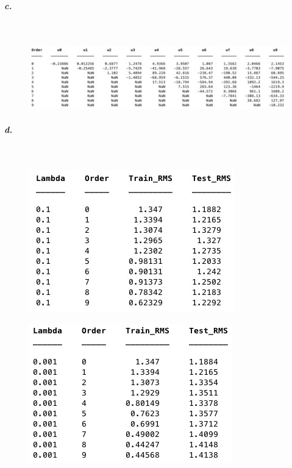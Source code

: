 \documentclass[]{article}
\begin{document}
	\subparagraph{c.}\mbox{}\\
	
	\begin{figure}[H]
		\centering
		\includegraphics[width=1.2\linewidth]{2gc1}
		\caption{}
		\label{fig:2gc1}
	\end{figure}
	
	\subparagraph{d.}\mbox{}\\
	
	\begin{figure}[H]
		\centering
		\includegraphics[width=0.8\linewidth]{2gd1}
		\caption{}
		\label{fig:2gd1}
	\end{figure}    
	\begin{figure}[H]
		\centering
		\includegraphics[width=0.8\linewidth]{2gd2}
		\caption{}
		\label{fig:2gd2}
	\end{figure}
	
\end{document}
